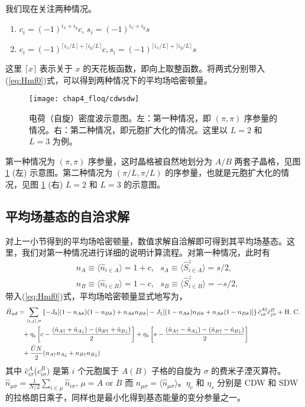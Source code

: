 我们现在关注两种情况。
\begin{enumerate}
    \item $c_i=(-1)^{i_x+i_y}c$, $s_i=(-1)^{i_x+i_y}s$
    \item $c_i=(-1)^{\lceil i_x/L \rceil + \lceil i_y/L \rceil}c, s_i=(-1)^{\lceil i_x/L \rceil + \lceil i_y/L \rceil}s$  
\end{enumerate}
这里 $\lceil x \rceil$ 表示关于 $x$ 的天花板函数，即向上取整函数。将两式分别带入(\ref{eq:Hmf0})式，可以得到两种情况下的平均场哈密顿量。

\begin{figure}[!htb]
\centering
\texttt{[image: chap4\_floq/cdwsdw]}
\caption{电荷（自旋）密度波示意图。左：第一种情况，即 $(\pi,\pi)$ 序参量的情况。右：第二种情况，即元胞扩大化的情况。这里以 $L=2$ 和 $L=3$ 为例。}\label{fig:floq:cdwsdw}
\end{figure}

第一种情况为 $(\pi,\pi)$ 序参量\cite{nagaosa}，这时晶格被自然地划分为 $A/B$ 两套子晶格，见图 \ref{fig:floq:cdwsdw} (左) 示意图。第二种情况为 $(\pi/L,\pi/L)$ 的序参量，也就是元胞扩大化的情况，见图 \ref{fig:floq:cdwsdw} (右) $L=2$ 和 $L=3$ 的示意图。


\subsection{平均场基态的自洽求解}
对上一小节得到的平均场哈密顿量，数值求解自洽解即可得到其平均场基态。这里，我们对第一种情况进行详细的说明计算流程。对第一种情况，此时有
\begin{align}
    &n_A\equiv\langle \hat{n}_{i\in A} \rangle = 1 + c , \  \  \
    s_A\equiv\langle \hat{S}_{i\in A}^{z} \rangle = s/2,\label{order1} \\
    &n_B\equiv\langle \hat{n}_{i\in B} \rangle = 1 - c , \  \  \
    s_B\equiv\langle \hat{S}_{i\in B}^{z} \rangle = -s/2,\label{order2}
\end{align}
带入(\ref{eq:Hmf0})式，平均场哈密顿量显式地写为，
\begin{align}\label{eq:Hmf}
    \hat{H}_{\text{mf}} &= \sum_{\langle i,j\rangle,\sigma} \left\{-J_0[(1-n_{A\bar{\sigma}})(1-n_{B\bar{\sigma}})+n_{A\bar{\sigma}}n_{B\bar{\sigma}}] - J_1[(1-n_{A\bar{\sigma}})n_{B\bar{\sigma}}+n_{A\bar{\sigma}}(1-n_{B\bar{\sigma}})]\right\}\hat{c}_{i\sigma}^{A\dagger}\hat{c}_{j\sigma}^B+ \text{H. C. } \notag \\
    & \  \  + \eta_c \left[c-\frac{(\hat{n}_{A\uparrow}+\hat{n}_{A\downarrow}) - (\hat{n}_{B\uparrow}+\hat{n}_{B\downarrow})}{2}\right] 
    + \eta_s \left[s-\frac{(\hat{n}_{A\uparrow}-\hat{n}_{A\downarrow}) - (\hat{n}_{B\uparrow}-\hat{n}_{B\downarrow})}{2}\right] \notag \\
    & \  \  + \frac{\tilde{U}N}{2}(n_{A\uparrow}n_{A\downarrow} + n_{B\uparrow}n_{B\downarrow}) 
\end{align}
其中 $\hat{c}_{i\sigma}^A$($\hat{c}_{i\sigma}^B$) 是第 $i$ 个元胞属于 $A(B)$ 子格的自旋为 $\sigma$ 的费米子湮灭算符。$\hat{n}_{\mu\sigma} = \frac{1}{N/2}\sum_{i\in\mu}\hat{n}_{i\sigma}$, $\mu = A$ or $B$ 而 $n_{\mu\sigma} = \langle\hat{n}_{\mu\sigma}\rangle$。$\eta_c$ 和 $\eta_s$ 分别是 CDW 和 SDW 的拉格朗日乘子，同样也是最小化得到基态能量的变分参量之一。

